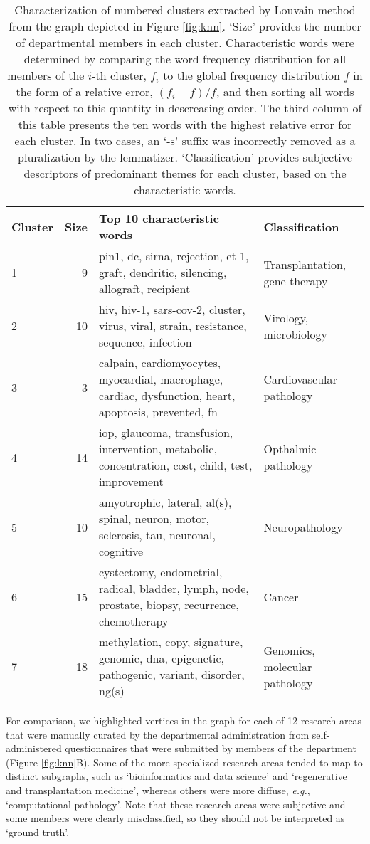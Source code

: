 \documentclass[12pt]{article}
\begin{document}
\begin{table}[tbp]
\centering
\begin{tabular}{lrp{3.6in}p{1.2in}}
Cluster & Size & Top 10 characteristic words & Classification\\
\hline
1 & 9 & pin1, dc, sirna, rejection, et-1, graft, dendritic, silencing, allograft, recipient & Transplantation, gene therapy\\
2 & 10 & hiv, hiv-1, sars-cov-2, cluster, virus, viral, strain, resistance, sequence, infection & Virology, microbiology\\
3 & 3 & calpain, cardiomyocytes, myocardial, macrophage, cardiac, dysfunction, heart, apoptosis, prevented, fn & Cardiovascular pathology\\
4 & 14 & iop, glaucoma, transfusion, intervention, metabolic, concentration, cost, child, test, improvement & Opthalmic pathology\\
5 & 10 & amyotrophic, lateral, al(s), spinal, neuron, motor, sclerosis, tau, neuronal, cognitive & Neuropathology\\
6 & 15 & cystectomy, endometrial, radical, bladder, lymph, node, prostate, biopsy, recurrence, chemotherapy & Cancer\\
7 & 18 & methylation, copy, signature, genomic, dna, epigenetic, pathogenic, variant, disorder, ng(s) & Genomics, molecular pathology\\
\hline
\end{tabular}
\caption{
Characterization of numbered clusters extracted by Louvain method from the graph depicted in Figure \ref{fig:knn}.
`Size' provides the number of departmental members in each cluster.
Characteristic words were determined by comparing the word frequency distribution for all members of the $i$-th cluster, $f_i$ to the global frequency distribution $f$ in the form of a relative error, $(f_i-f)/f$, and then sorting all words with respect to this quantity in descreasing order.
The third column of this table presents the ten words with the highest relative error for each cluster.
In two cases, an `-s' suffix was incorrectly removed as a pluralization by the lemmatizer.
`Classification' provides subjective descriptors of predominant themes for each cluster, based on the characteristic words.
}
\label{tab:clusters}
\end{table}


For comparison, we highlighted vertices in the graph for each of 12 research areas that were manually curated by the departmental administration from self-administered questionnaires that were submitted by members of the department (Figure \ref{fig:knn}B).
Some of the more specialized research areas tended to map to distinct subgraphs, such as `bioinformatics and data science' and `regenerative and transplantation medicine', whereas others were more diffuse, \textit{e.g.}, `computational pathology'.
Note that these research areas were subjective and some members were clearly misclassified, so they should not be interpreted as `ground truth'.
\end{document}
